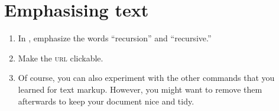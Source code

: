 \section{Emphasising text}

\begin{enumerate}
  \item In , emphasize the words 
  ``recursion'' and ``recursive.''
  \item Make the \textsc{url} clickable. 
  \item Of course, you can also experiment with the other commands that you learned for text markup. However, you might want to remove them afterwards to keep your document nice and tidy.
\end{enumerate}

